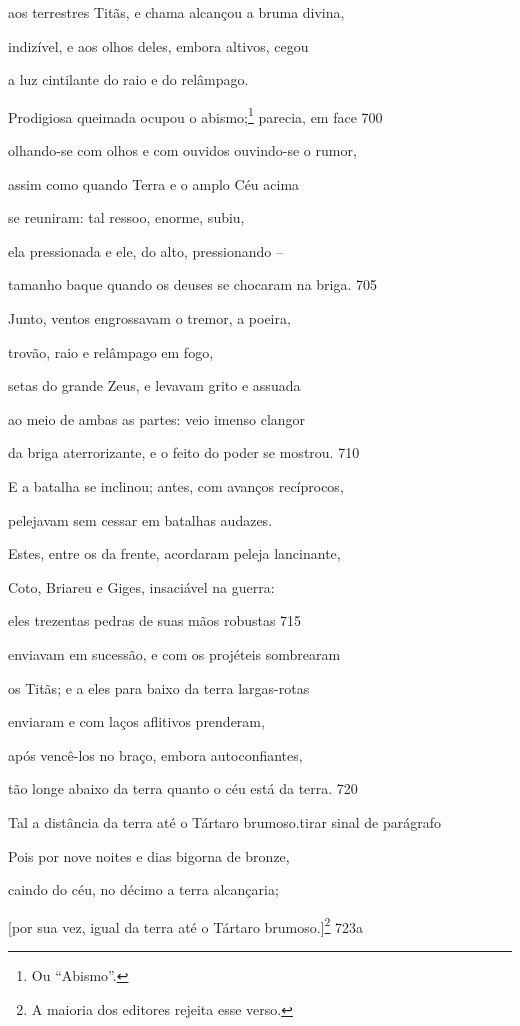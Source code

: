 aos terrestres Titãs, e chama alcançou a bruma divina,

indizível, e aos olhos deles, embora altivos, cegou

a luz cintilante do raio e do relâmpago.

Prodigiosa queimada ocupou o abismo;\footnote{Ou ``Abismo''.} parecia, em face \num{700}

olhando-se com olhos e com ouvidos ouvindo-se o rumor,

assim como quando Terra e o amplo Céu acima

se reuniram: tal ressoo, enorme, subiu,

ela pressionada e ele, do alto, pressionando --

tamanho baque quando os deuses se chocaram na briga. \num{705}

Junto, ventos engrossavam o tremor, a poeira,

trovão, raio e relâmpago em fogo,

setas do grande Zeus, e levavam grito e assuada

ao meio de ambas as partes: veio imenso clangor

da briga aterrorizante, e o feito do poder se mostrou. \num{710}

\quad{}E a batalha se inclinou; antes, com avanços recíprocos,

pelejavam sem cessar em batalhas audazes.

Estes, entre os da frente, acordaram peleja lancinante,

Coto, Briareu e Giges, insaciável na guerra:

eles trezentas pedras de suas mãos robustas \num{715}

enviavam em sucessão, e com os projéteis sombrearam

os Titãs; e a eles para baixo da terra largas-rotas

enviaram e com laços aflitivos prenderam,

após vencê-los no braço, embora autoconfiantes,

tão longe abaixo da terra quanto o céu está da terra. \num{720}

\medskip

Tal a distância da terra até o Tártaro brumoso.tirar sinal de parágrafo

Pois por nove noites e dias bigorna de bronze,

caindo do céu, no décimo a terra alcançaria;

{[}por sua vez, igual da terra até o Tártaro brumoso.{]}\footnote{A maioria dos editores rejeita esse verso.} \num{723a}

